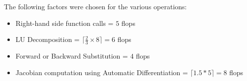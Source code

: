 \documentclass[notitlepage,12pt]{article}
\begin{document}
The following factors were chosen for the various operations:\\
\begin{itemize}
\item Right-hand side function calls = $5$ flops
\item LU Decomposition = $\lceil \frac{2}{3}\times 8\rceil = 6$ flops
\item Forward or Backward Substitution = $4$ flops
\item Jacobian computation using Automatic Differentiation = $\lceil 1.5*5 \rceil = 8$ flops
\end{itemize}














\end{document}
